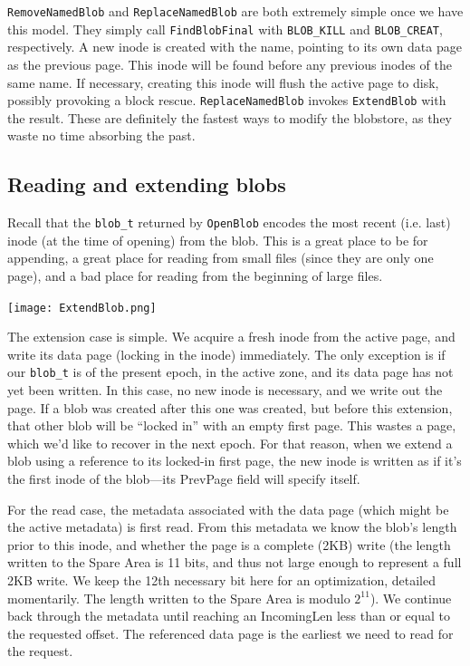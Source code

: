 \documentclass[letterpaper,10pt]{article}
\begin{document}
\texttt{RemoveNamedBlob} and \texttt{ReplaceNamedBlob} are both extremely
simple once we have this model. They simply call \texttt{FindBlobFinal} with
\texttt{BLOB\_KILL} and \texttt{BLOB\_CREAT}, respectively. A new inode is
created with the name, pointing to its own data page as the previous page.
This inode will be found before any previous inodes of the same name. If
necessary, creating this inode will flush the active page to disk, possibly
provoking a block rescue. \texttt{ReplaceNamedBlob} invokes \texttt{ExtendBlob}
with the result. These are definitely the fastest ways to modify the blobstore,
as they waste no time absorbing the past.

\subsection{Reading and extending blobs}
Recall that the \texttt{blob\_t} returned by \texttt{OpenBlob} encodes the most
recent (i.e. last) inode (at the time of opening) from the blob. This is a
great place to be for appending, a great place for reading from small files
(since they are only one page), and a bad place for reading from the beginning
of large files.

\begin{minipage}{\textwidth}
\begin{center}
\texttt{[image: ExtendBlob.png]}
\end{center}
\end{minipage}

The extension case is simple. We acquire a fresh inode from the
active page, and write its data page (locking in the inode) immediately. The
only exception is if our \texttt{blob\_t} is of the present epoch, in the
active zone, and its data page has not yet been written. In this case, no new
inode is necessary, and we write out the page. If a blob was created after this
one was created, but before this extension, that other blob will be ``locked in'' with an
empty first page. This wastes a page, which we'd like to recover in the next
epoch. For that reason, when we extend a blob using a reference to its locked-in
first page, the new inode is written as if it's the first inode of the blob---its
PrevPage field will specify itself.

For the read case, the metadata associated with the data
page (which might be the active metadata) is first read. From this metadata we
know the blob's length prior to this inode, and whether the page is a complete
(2KB) write (the length written to the Spare Area is 11 bits, and thus not
large enough to represent a full 2KB write. We keep the 12th necessary bit here
for an optimization, detailed momentarily. The length written to the Spare Area
is modulo $2^{11}$). We continue back through the metadata until reaching an
IncomingLen less than or equal to the requested offset. The referenced data
page is the earliest we need to read for the request.
\end{document}
